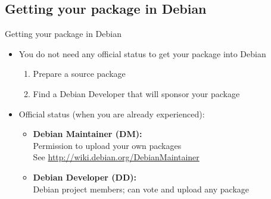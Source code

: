 \documentclass[10pt,final]{beamer}
\begin{document}
\subsection{Getting your package in Debian}
\begin{frame}{Getting your package in Debian}
\begin{itemize}
\item You do not need any official status to get your package into Debian
	\begin{enumerate}
		\item Prepare a source package
			\hbr
		\item Find a Debian Developer that will sponsor your package
	\end{enumerate}
\br
\item Official status (when you are already experienced):
	\begin{itemize}
		\item \textbf{Debian Maintainer (DM):}\\
			Permission to upload your own packages\\
			See \url{http://wiki.debian.org/DebianMaintainer}
			\hbr
		\item \textbf{Debian Developer (DD):}\\
			Debian project members; can vote and upload any package
	\end{itemize}
\end{itemize}
\end{frame}
\end{document}
